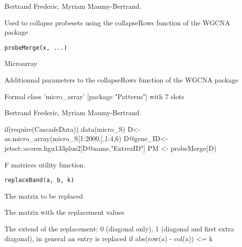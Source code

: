 \documentclass[a4paper]{book}
\begin{document}
%
\begin{Author}\relax
Bertrand Frederic, Myriam Maumy-Bertrand.
\end{Author}
%
\begin{Description}\relax
Used to collapse probesets using the collapseRows function of the WGCNA package
\end{Description}
%
\begin{Usage}
\begin{verbatim}
probeMerge(x, ...)
\end{verbatim}
\end{Usage}
%
\begin{Arguments}
\begin{ldescription}
\item[\code{x}] Microarray
\item[\code{...}] Additionnal parameters to the collapseRows function of the WGCNA package
\end{ldescription}
\end{Arguments}
%
\begin{Value}
Formal class 'micro\_array' [package "Patterns"] with 7 slots
\end{Value}
%
\begin{Author}\relax
Bertrand Frederic, Myriam Maumy-Bertrand.
\end{Author}
%
\begin{Examples}
\begin{ExampleCode}
if(require(CascadeData)){
data(micro_S)
D<-as.micro_array(micro_S[1:2000,],1:4,6)
D@gene_ID<-jetset::scores.hgu133plus2[D@name,"EntrezID"]
PM <- probeMerge(D)
}
\end{ExampleCode}
\end{Examples}
%
\begin{Description}\relax
F matrices utility function.
\end{Description}
%
\begin{Usage}
\begin{verbatim}
replaceBand(a, b, k)
\end{verbatim}
\end{Usage}
%
\begin{Arguments}
\begin{ldescription}
\item[\code{a}] The matrix to be replaced
\item[\code{b}] The matrix with the replacement values
\item[\code{k}] The extend of the replacement: 0 (diagonal only), 1 (diagonal and first extra diagonal), in general an entry is replaced if abs(row(a) - col(a)) <= k
\end{ldescription}
\end{Arguments}
\end{document}
